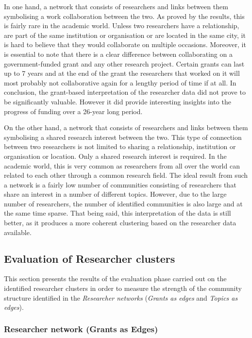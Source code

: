 {In one hand, a network that consists of researchers and links between them symbolising a work collaboration between the two. As proved by the results, this is fairly rare in the academic world. Unless two researchers have a relationship, are part of the same institution or organisation or are located in the same city, it is hard to believe that they would collaborate on multiple occasions. Moreover, it is essential to note that there is a clear difference between collaborating on a government-funded grant and any other research project. Certain grants can last up to 7 years and at the end of the grant the researchers that worked on it will most probably not collaborative again for a lengthy period of time if at all. In conclusion, the grant-based interpretation of the researcher data did not prove to be significantly valuable. However it did provide interesting insights into the progress of funding over a 26-year long period.

On the other hand, a network that consists of researchers and links between them symbolising a shared research interest between the two. This type of connection between two researchers is not limited to sharing a relationship, institution or organisation or location. Only a shared research interest is required. In the academic world, this is very common as researchers from all over the world can related to each other through a common research field. The ideal result from such a network is a fairly low number of communities consisting of researchers that share an interest in a number of different topics. However, due to the large number of researchers, the number of identified communities is also large and at the same time sparse. That being said, this interpretation of the data is still better, as it produces a more coherent clustering based on the researcher data available.

\subsection{Evaluation of Researcher clusters}

This section presents the results of the evaluation phase carried out on the identified researcher clusters in order to measure the strength of the community structure identified in the \textit{Researcher networks} (\textit{Grants as edges} and \textit{Topics as edges}).

\subsubsection{Researcher network (Grants as Edges)}

}

